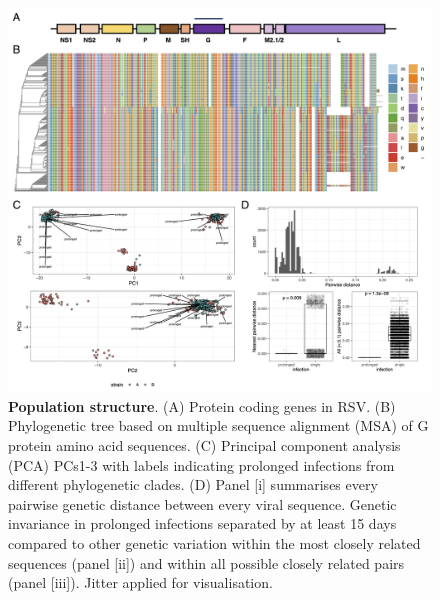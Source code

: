 \documentclass{article} %
\begin{document}
\begin{figure}[ht] \hspace{-0.5cm} 
    \includegraphics[scale=0.8]{f2}
	\caption{\textbf{Population structure}.
(A) Protein coding genes in RSV.
(B) Phylogenetic tree based on multiple sequence alignment (MSA) of G protein amino acid sequences.
(C) Principal component analysis (PCA) PCs1-3 with labels indicating prolonged infections from different phylogenetic clades.
(D) Panel [i] summarises every pairwise genetic distance between every viral sequence.
Genetic invariance in prolonged infections separated by at least 15 days compared to other genetic variation within the most closely related sequences
(panel [ii]) and within all possible closely related pairs (panel [iii]). Jitter applied for visualisation.}
	\label{fig:2} 
\end{figure}
\clearpage
\end{document}
